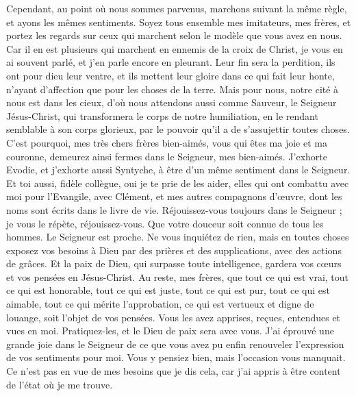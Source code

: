 \begin{multicols}{2}
Cependant, au point où nous sommes parvenus, marchons suivant la même règle, et ayons les mêmes sentiments.
Soyez tous ensemble mes imitateurs, mes frères, et portez les regards sur ceux qui marchent selon le modèle que vous avez en nous.
Car il en est plusieurs qui marchent en ennemis de la croix de Christ, je vous en ai souvent parlé, et j’en parle encore en pleurant.
Leur fin sera la perdition, ils ont pour dieu leur ventre, et ils mettent leur gloire dans ce qui fait leur honte, n'ayant d'affection que pour les choses de la terre.
Mais pour nous, notre cité à nous est dans les cieux, d'où nous attendons aussi comme Sauveur, le Seigneur Jésus-Christ,
qui transformera le corps de notre humiliation, en le rendant semblable à son corps glorieux, par le pouvoir qu’il a de s’assujettir toutes choses.
\VerseOne{}C'est pourquoi, mes très chers frères bien-aimés, vous qui êtes ma joie et ma couronne, demeurez ainsi fermes dans le Seigneur, mes bien-aimés.
J’exhorte Evodie, et j’exhorte aussi Syntyche, à être d’un même sentiment dans le Seigneur.
Et toi aussi, fidèle collègue, oui je te prie de les aider, elles qui ont combattu avec moi pour l'Evangile, avec Clément, et mes autres compagnons d’œuvre, dont les noms sont écrits dans le livre de vie.
Réjouissez-vous toujours dans le Seigneur ; je vous le répète, réjouissez-vous.
Que votre douceur soit connue de tous les hommes. Le Seigneur est proche.
Ne vous inquiétez de rien, mais en toutes choses exposez vos besoins à Dieu par des prières et des supplications, avec des actions de grâces.
Et la paix de Dieu, qui surpasse toute intelligence, gardera vos cœurs et vos pensées en Jésus-Christ.
Au reste, mes frères, que tout ce qui est vrai, tout ce qui est honorable, tout ce qui est juste, tout ce qui est pur, tout ce qui est aimable, tout ce qui mérite l’approbation, ce qui est vertueux et digne de louange, soit l’objet de vos pensées.
Vous les avez apprises, reçues, entendues et vues en moi. Pratiquez-les, et le Dieu de paix sera avec vous.
J’ai éprouvé une grande joie dans le Seigneur de ce que vous avez pu enfin renouveler l’expression de vos sentiments pour moi. Vous y pensiez bien, mais l’occasion vous manquait.
Ce n’est pas en vue de mes besoins que je dis cela, car j’ai appris à être content de l’état où je me trouve.

\end{multicols}
